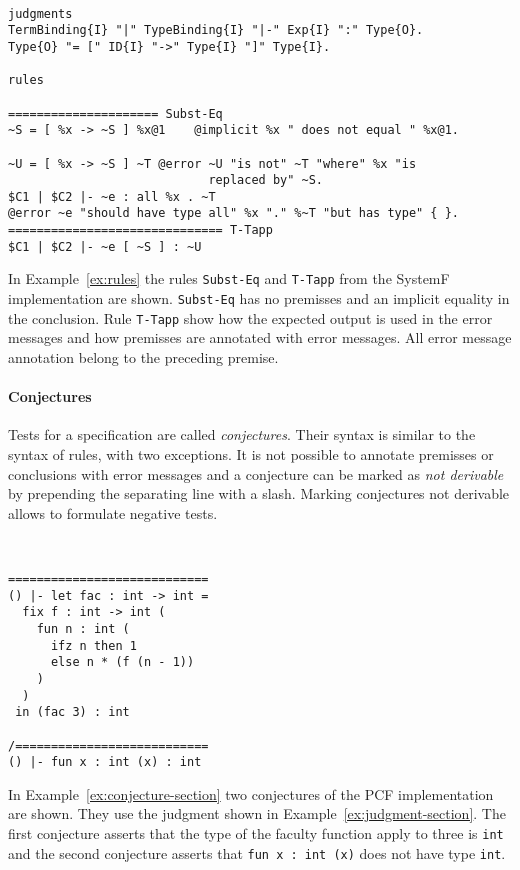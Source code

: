 \begin{example}{~}
\begin{lstlisting}[language=sltc]
judgments
TermBinding{I} "|" TypeBinding{I} "|-" Exp{I} ":" Type{O}.
Type{O} "= [" ID{I} "->" Type{I} "]" Type{I}.

rules

===================== Subst-Eq
~S = [ %x -> ~S ] %x@1    @implicit %x " does not equal " %x@1.

~U = [ %x -> ~S ] ~T @error ~U "is not" ~T "where" %x "is
                            replaced by" ~S.
$C1 | $C2 |- ~e : all %x . ~T 
@error ~e "should have type all" %x "." %~T "but has type" { }.
============================== T-Tapp
$C1 | $C2 |- ~e [ ~S ] : ~U
\end{lstlisting}
\label{ex:rules}
\end{example}

In Example~\ref{ex:rules} the rules \verb|Subst-Eq| and \verb|T-Tapp|
from the SystemF  implementation are
shown. \verb|Subst-Eq| has no premisses and an implicit equality in
the conclusion. Rule \verb|T-Tapp| show how the expected output is
used in the error messages and how premisses are annotated with error
messages. All error message annotation belong to the preceding
premise.

\paragraph{Conjectures} Tests for a specification are called
\textit{conjectures}. Their syntax is similar to the syntax of rules,
with two exceptions. It is not possible to annotate premisses or
conclusions with error messages and a conjecture can be marked as
\textit{not derivable} by prepending the separating line with a
slash. Marking conjectures not derivable allows to formulate negative
tests.

\begin{example}{~}
\begin{lstlisting}[language=sltc]
============================
() |- let fac : int -> int = 
  fix f : int -> int (
    fun n : int (
      ifz n then 1 
      else n * (f (n - 1))
    )
  )
 in (fac 3) : int

/===========================
() |- fun x : int (x) : int
\end{lstlisting}
\label{ex:conjecture-section}
\end{example}

In Example~\ref{ex:conjecture-section} two conjectures of the PCF
implementation are shown. They use the judgment shown in
Example~\ref{ex:judgment-section}. The first conjecture asserts that
the type of the faculty function apply to three is \verb|int| and the
second conjecture asserts that \verb|fun x : int (x)| does not have
type \verb|int|.

